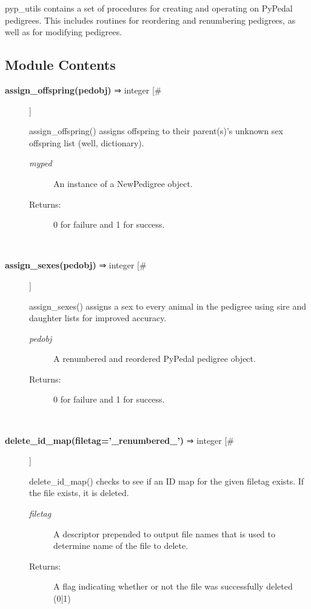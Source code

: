 \par pyp\_utils contains a set of procedures for creating and operating on PyPedal pedigrees.
This includes routines for reordering and renumbering pedigrees, as well as for modifying
pedigrees.
\subsection*{Module Contents}
\begin{description}
\item[\textbf{assign\_offspring(pedobj)} ⇒ integer [\#]
]
\par assign\_offspring() assigns offspring to their parent(s)'s unknown sex offspring list (well, dictionary).
\begin{description}
\item[\textit{myped}
]
An instance of a NewPedigree object.
\item[Returns:
]
0 for failure and 1 for success.
\end{description}\\

\item[\textbf{assign\_sexes(pedobj)} ⇒ integer [\#]
]
\par assign\_sexes() assigns a sex to every animal in the pedigree using sire and daughter lists for improved accuracy.
\begin{description}
\item[\textit{pedobj}
]
A renumbered and reordered PyPedal pedigree object.
\item[Returns:
]
0 for failure and 1 for success.
\end{description}\\

\item[\textbf{delete\_id\_map(filetag='\_renumbered\_')} ⇒ integer [\#]
]
\par delete\_id\_map() checks to see if an ID map for the given filetag exists.  If the file exists, it is
deleted.
\begin{description}
\item[\textit{filetag}
]
A descriptor prepended to output file names that is used to determine name of the file to delete.
\item[Returns:
]
A flag indicating whether or not the file was successfully deleted (0|1)
\end{description}\\


\end{description}

